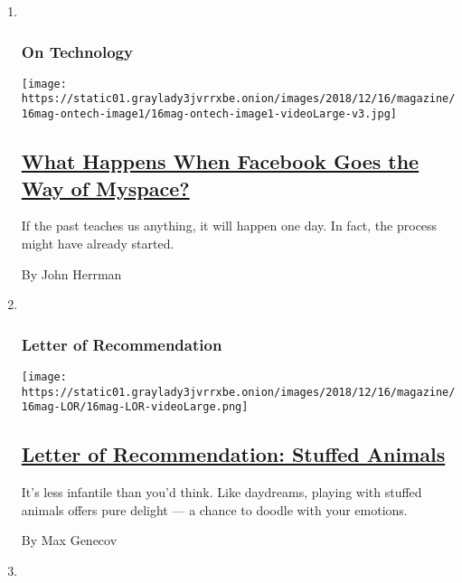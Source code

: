 \begin{enumerate}
\def\labelenumi{\arabic{enumi}.}
\item ~
  \hypertarget{on-technology}{%
  \subsubsection{On Technology}\label{on-technology}}

  \texttt{[image: https://static01.graylady3jvrrxbe.onion/images/2018/12/16/magazine/16mag-ontech-image1/16mag-ontech-image1-videoLarge-v3.jpg]}

  \hypertarget{what-happens-when-facebook-goes-the-way-of-myspace}{%
  \subsection{\texorpdfstring{\href{/2018/12/12/magazine/what-happens-when-facebook-goes-the-way-of-myspace.html}{What
  Happens When Facebook Goes the Way of
  Myspace?}}{What Happens When Facebook Goes the Way of Myspace?}}\label{what-happens-when-facebook-goes-the-way-of-myspace}}

  If the past teaches us anything, it will happen one day. In fact, the
  process might have already started.

  By John Herrman
\item ~
  \hypertarget{letter-of-recommendation}{%
  \subsubsection{Letter of
  Recommendation}\label{letter-of-recommendation}}

  \texttt{[image: https://static01.graylady3jvrrxbe.onion/images/2018/12/16/magazine/16mag-LOR/16mag-LOR-videoLarge.png]}

  \hypertarget{letter-of-recommendation-stuffed-animals}{%
  \subsection{\texorpdfstring{\href{/2018/12/13/magazine/letter-of-recommendation-stuffed-animals.html}{Letter
  of Recommendation: Stuffed
  Animals}}{Letter of Recommendation: Stuffed Animals}}\label{letter-of-recommendation-stuffed-animals}}

  It's less infantile than you'd think. Like daydreams, playing with
  stuffed animals offers pure delight --- a chance to doodle with your
  emotions.

  By Max Genecov
\item ~
  \hypertarget{eat}{%
}
\end{enumerate}
